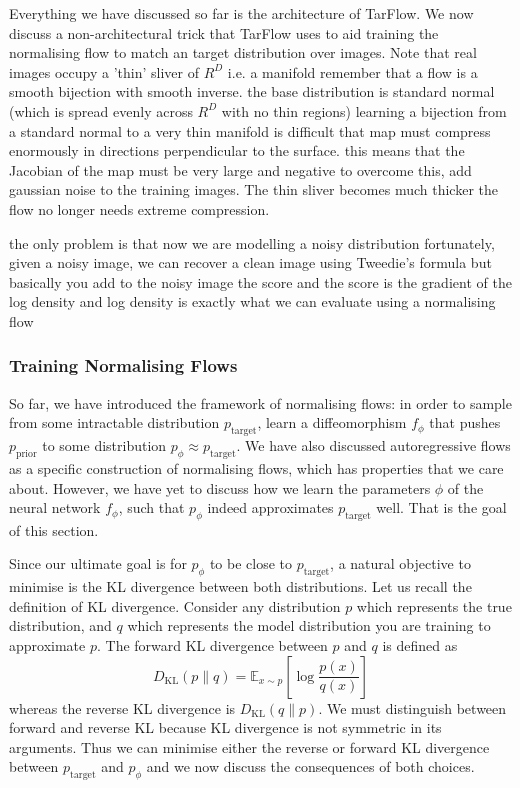 \documentclass[12pt,a4paper]{report}
\begin{document}
Everything we have discussed so far is the architecture of TarFlow. 
We now discuss a non-architectural trick that TarFlow uses to aid training the normalising flow to match an target distribution over images. 
Note that real images occupy a 'thin' sliver of $R^D$ i.e. a manifold
remember that a flow is a smooth bijection with smooth inverse. 
the base distribution is standard normal (which is spread evenly across $R^D$ with no thin regions)
learning a bijection from a standard normal to a very thin manifold is difficult
that map must compress enormously in directions perpendicular to the surface.
this means that the Jacobian of the map must be very large and negative
to overcome this, add gaussian noise to the training images. 
The thin sliver becomes much thicker
the flow no longer needs extreme compression. 

the only problem is that now we are modelling a noisy distribution
fortunately, given a noisy image, we can recover a clean image using Tweedie’s formula
but basically you add to the noisy image the score
and the score is the gradient of the log density
and log density is exactly what we can evaluate using a normalising flow

\subsubsection{Training Normalising Flows}
So far, we have introduced the framework of normalising flows: in order to sample from some intractable distribution $p_\text{target}$, learn a diffeomorphism $f_\phi$ that pushes $p_\text{prior}$ to some distribution $p_\phi \approx p_\text{target}$. We have also discussed autoregressive flows as a specific construction of normalising flows, which has properties that we care about. However, we have yet to discuss how we learn the parameters $\phi$ of the neural network $f_\phi$, such that $p_\phi$ indeed approximates $p_\text{target}$ well. That is the goal of this section. 

Since our ultimate goal is for $p_\phi$ to be close to $p_\text{target}$, a natural objective to minimise is the KL divergence between both distributions. Let us recall the definition of KL divergence. Consider any distribution $p$ which represents the true distribution, and $q$ which represents the model distribution you are training to approximate $p$. The forward KL divergence between $p$ and $q$ is defined as 
$$ D_{\mathrm{KL}}(p \parallel q) = \mathbb{E}_{x \sim p} \left[ \log \frac{p(x)}{q(x)} \right] $$
whereas the reverse KL divergence is $ D_{\mathrm{KL}}(q\parallel p) $. We must distinguish between forward and reverse KL because KL divergence is not symmetric in its arguments. Thus we can minimise either the reverse or forward KL divergence between $p_\text{target}$ and $p_\phi$ and we now discuss the consequences of both choices. 
\end{document}
